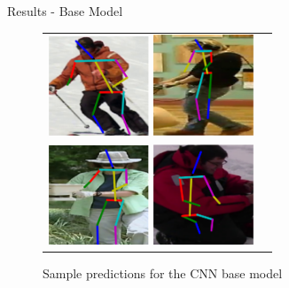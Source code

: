 \documentclass[10pt]{beamer}
\begin{document}
\begin{frame}{Results - Base Model}
\begin{figure}
\begin{tabular}{cc}
\includegraphics[width=30mm]{../images/base_1}
\includegraphics[width=30mm]{../images/base_2}\\
\includegraphics[width=30mm]{../images/base_3}
\includegraphics[width=30mm]{../images/base_4}\\
\end{tabular}
\caption{Sample predictions for the CNN base model}
\label{fig:base_images}
\end{figure}
\end{frame}
\end{document}
